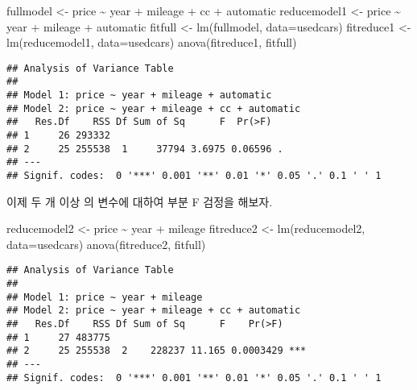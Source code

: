 \documentclass[
]{book}
\newenvironment{Shaded}{\begin{snugshade}}{\end{snugshade}}
\newcommand{\AttributeTok}[1]{\textcolor[rgb]{0.77,0.63,0.00}{#1}}
\newcommand{\FunctionTok}[1]{\textcolor[rgb]{0.00,0.00,0.00}{#1}}
\newcommand{\NormalTok}[1]{#1}
\newcommand{\OtherTok}[1]{\textcolor[rgb]{0.56,0.35,0.01}{#1}}
\newcommand{\SpecialCharTok}[1]{\textcolor[rgb]{0.00,0.00,0.00}{#1}}
\begin{document}
\begin{Shaded}
\begin{Highlighting}[]
\NormalTok{fullmodel }\OtherTok{\textless{}{-}}\NormalTok{ price }\SpecialCharTok{\textasciitilde{}}\NormalTok{ year }\SpecialCharTok{+}\NormalTok{ mileage }\SpecialCharTok{+}\NormalTok{ cc }\SpecialCharTok{+}\NormalTok{ automatic}
\NormalTok{reducemodel1 }\OtherTok{\textless{}{-}}\NormalTok{ price }\SpecialCharTok{\textasciitilde{}}\NormalTok{ year }\SpecialCharTok{+}\NormalTok{ mileage }\SpecialCharTok{+}\NormalTok{ automatic}
\NormalTok{fitfull }\OtherTok{\textless{}{-}} \FunctionTok{lm}\NormalTok{(fullmodel, }\AttributeTok{data=}\NormalTok{usedcars)}
\NormalTok{fitreduce1 }\OtherTok{\textless{}{-}} \FunctionTok{lm}\NormalTok{(reducemodel1, }\AttributeTok{data=}\NormalTok{usedcars)}
\FunctionTok{anova}\NormalTok{(fitreduce1, fitfull)}
\end{Highlighting}
\end{Shaded}

\begin{verbatim}
## Analysis of Variance Table
## 
## Model 1: price ~ year + mileage + automatic
## Model 2: price ~ year + mileage + cc + automatic
##   Res.Df    RSS Df Sum of Sq      F  Pr(>F)  
## 1     26 293332                              
## 2     25 255538  1     37794 3.6975 0.06596 .
## ---
## Signif. codes:  0 '***' 0.001 '**' 0.01 '*' 0.05 '.' 0.1 ' ' 1
\end{verbatim}

이제 두 개 이상
의 변수에 대하여 부분 F 검정을 해보자.

\begin{Shaded}
\begin{Highlighting}[]
\NormalTok{reducemodel2 }\OtherTok{\textless{}{-}}\NormalTok{ price }\SpecialCharTok{\textasciitilde{}}\NormalTok{ year }\SpecialCharTok{+}\NormalTok{ mileage}
\NormalTok{fitreduce2 }\OtherTok{\textless{}{-}} \FunctionTok{lm}\NormalTok{(reducemodel2, }\AttributeTok{data=}\NormalTok{usedcars)}
\FunctionTok{anova}\NormalTok{(fitreduce2, fitfull)}
\end{Highlighting}
\end{Shaded}

\begin{verbatim}
## Analysis of Variance Table
## 
## Model 1: price ~ year + mileage
## Model 2: price ~ year + mileage + cc + automatic
##   Res.Df    RSS Df Sum of Sq      F    Pr(>F)    
## 1     27 483775                                  
## 2     25 255538  2    228237 11.165 0.0003429 ***
## ---
## Signif. codes:  0 '***' 0.001 '**' 0.01 '*' 0.05 '.' 0.1 ' ' 1
\end{verbatim}
\end{document}
